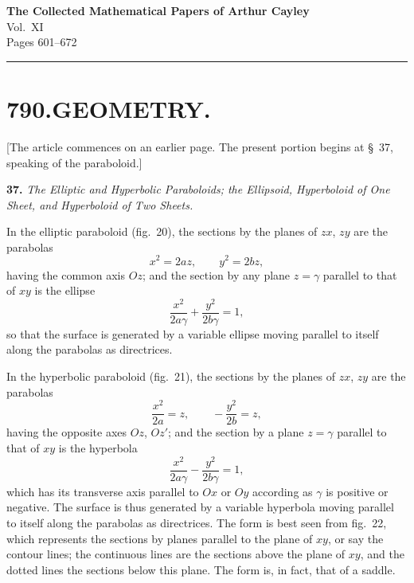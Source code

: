 \documentclass[11pt,a4paper]{article}
\begin{document}
\begin{center}
{\LARGE\bfseries The Collected Mathematical Papers of Arthur Cayley}\\[6pt]
{\Large Vol.~XI}\\[12pt]
{\large Pages 601--672}
\end{center}

\vspace{1em}
\hrule
\vspace{2em}



\section*{790.\quad GEOMETRY.}


\smallskip

[The article commences on an earlier page. The present portion begins at \S~37, 
speaking of the paraboloid.]

\smallskip

\textbf{37.}\quad
\textit{The Elliptic and Hyperbolic Paraboloids; the Ellipsoid, Hyperboloid of One Sheet, and Hyperboloid of Two Sheets.}

In the elliptic paraboloid (fig.~20), the sections by the planes of $zx$, $zy$ are the parabolas
\[
x^{2} = 2az, \qquad y^{2} = 2bz,
\]
having the common axis $Oz$; and the section by any plane $z = \gamma$ parallel to that of $xy$ is the ellipse
\[
\frac{x^{2}}{2a\gamma} + \frac{y^{2}}{2b\gamma} = 1,
\]
so that the surface is generated by a variable ellipse moving parallel to itself along the parabolas as directrices.

In the hyperbolic paraboloid (fig.~21), the sections by the planes of $zx$, $zy$ are the parabolas
\[
\frac{x^{2}}{2a} = z, \qquad -\frac{y^{2}}{2b} = z,
\]
having the opposite axes $Oz$, $Oz'$; and the section by a plane $z = \gamma$ parallel to that of $xy$ is the hyperbola
\[
\frac{x^{2}}{2a\gamma} - \frac{y^{2}}{2b\gamma} = 1,
\]
which has its transverse axis parallel to $Ox$ or $Oy$ according as $\gamma$ is positive or negative. The surface is thus generated by a variable hyperbola moving parallel to itself along the parabolas as directrices. The form is best seen from fig.~22, which represents the sections by planes parallel to the plane of $xy$, or say the contour lines; the continuous lines are the sections above the plane of $xy$, and the dotted lines the sections below this plane. The form is, in fact, that of a saddle.
\end{document}
